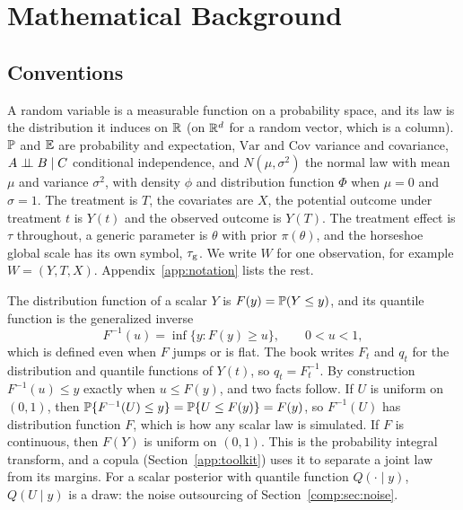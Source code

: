 \chapter{Mathematical Background}\label{app:background}



\section{Conventions}\label{sec:bg:conv}



A random variable is a measurable function on a probability space, and its law is the distribution it induces on $\mathbb{R}$ (on $\mathbb{R}^d$ for a random vector, which is a column). $\mathbb{P}$ and $\mathbb{E}$ are probability and expectation, $\mathrm{Var}$ and $\mathrm{Cov}$ variance and covariance, $A \perp\!\!\!\perp B \mid C$ conditional independence, and $N(\mu, \sigma^2)$ the normal law with mean $\mu$ and variance $\sigma^2$, with density $\phi$ and distribution function $\Phi$ when $\mu = 0$ and $\sigma = 1$. The treatment is $T$, the covariates are $X$, the potential outcome under treatment $t$ is $Y(t)$ and the observed outcome is $Y(T)$. The treatment effect is $\tau$ throughout, a generic parameter is $\theta$ with prior $\pi(\theta)$, and the horseshoe global scale has its own symbol, $\tau_{\mathrm{g}}$. We write $W$ for one observation, for example $W = (Y, T, X)$. Appendix~\ref{app:notation} lists the rest.

The distribution function of a scalar $Y$ is $F(y) = \mathbb{P}(Y \le y)$, and its quantile function is the generalized inverse
\[
F^{-1}(u) = \inf\{y : F(y) \ge u\}, \qquad 0 < u < 1,
\]
which is defined even when $F$ jumps or is flat. The book writes $F_t$ and $q_t$ for the distribution and quantile functions of $Y(t)$, so $q_t = F_t^{-1}$. By construction $F^{-1}(u) \le y$ exactly when $u \le F(y)$, and two facts follow. If $U$ is uniform on $(0, 1)$, then $\mathbb{P}\{F^{-1}(U) \le y\} = \mathbb{P}\{U \le F(y)\} = F(y)$, so $F^{-1}(U)$ has distribution function $F$, which is how any scalar law is simulated. If $F$ is continuous, then $F(Y)$ is uniform on $(0, 1)$. This is the probability integral transform, and a copula (Section~\ref{app:toolkit}) uses it to separate a joint law from its margins. For a scalar posterior with quantile function $Q(\cdot \mid y)$, $Q(U \mid y)$ is a draw: the noise outsourcing of Section~\ref{comp:sec:noise}.

